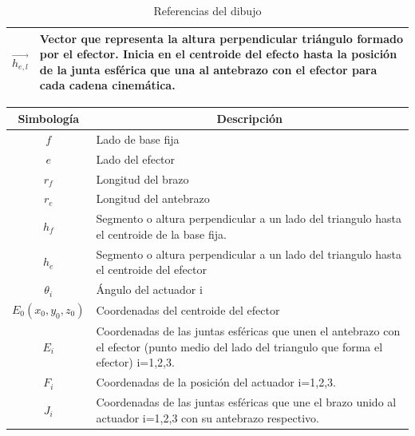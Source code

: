 \begin{table}[H]
\begin{tabular}{>{\centering\arraybackslash}m{2cm} >{\arraybackslash}m{5cm} }
              $\overrightarrow{h_{e,l}}$  & Vector que representa la altura perpendicular triángulo formado por el efector. Inicia en el centroide del efecto hasta la posición de la junta esférica que una al antebrazo con el efector para cada cadena cinemática.    \\\hline
            \end{tabular}
            \caption{Referencias del dibujo}
            \label{tab:Anexo_B_my_label}
        \end{table}
        
        \begingroup
            \renewcommand{\arraystretch}{1.5}
            \begin{table}[H]
                \centering
                \begin{tabular}{|c|m{12cm}|}
                   \hline
                   \textbf{Simbología}  & \multicolumn{1}{c|}{\textbf{Descripción}}  \\\hline
                   $f$  & Lado de base fija                                         \\\hline
                   $e$  & Lado del efector                                          \\\hline
                   $r_{f}$  & Longitud del brazo                                    \\\hline
                   $r_{e}$  & Longitud del antebrazo                                \\\hline
                   $h_{f}$  & Segmento o altura perpendicular a un lado del triangulo hasta el centroide de la base fija.     \\\hline
                   $h_{e}$  & Segmento o altura perpendicular a un lado del triangulo hasta el centroide del efector         \\\hline
                   $\theta_{i}$  & Ángulo del actuador i    \\\hline
                   $E_{0}(x_{0},y_{0},z_{0})$  & Coordenadas del centroide del efector   \\\hline
                   $E_{i}$  & Coordenadas de las juntas esféricas que unen el antebrazo con el efector (punto medio del lado
                   del triangulo que forma el efector) i=1,2,3.    \\\hline
                   $F_{i}$  & Coordenadas de la posición del actuador i=1,2,3.    \\\hline
                   $J_{i}$  & Coordenadas de las juntas esféricas que une el brazo unido al actuador i=1,2,3 con su antebrazo respectivo.    \\\hline

\end{tabular}
\end{table}
